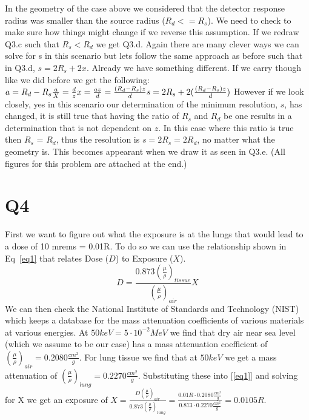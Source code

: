 \documentclass[12pt]{article}
\begin{document}
In the geometry of the case above we considered that the detector response radius was smaller than the source radius ($R_d <= R_s$). We need to check to make sure how things might change if we reverse this assumption. If we redraw Q3.c such that $R_s < R_d$ we get Q3.d. Again there are many clever ways we can solve for s in this scenario but lets follow the same approach as before such that in Q3.d, $s = 2R_s + 2x$. Already we have something different. If we carry though like we did before we get the following:\\
$a = R_d - R_s\\
\frac{a}{X} = \frac{d}{z}\\
x = \frac{az}{d} = \frac{(R_d-R_s)z}{d}\\
s = 2R_s + 2(\frac{(R_d-R_s)z}{d})\\$
However if we look closely, yes in this scenario our determination of the minimum resolution, $s$, has changed, it is still true that having the ratio of $R_s$ and $R_d$ be one results in a determination that is not dependent on $z$. In this case where this ratio is true then $R_s$ = $R_d$, thus the resolution is $s = 2R_s = 2R_d$, no matter what the geometry is. This becomes appearant when we draw it as seen in Q3.e. (All figures for this problem are attached at the end.)


\section{Q4}
First we want to figure out what the exposure is at the lungs that would lead to a dose of 10 mrems = 0.01R. To do so we can use the relationship shown in Eq~\ref{eq1} that relates Dose ($D$) to Exposure ($X$).
\begin{equation}
D = \frac{0.873(\frac{\mu}{\rho})_{tissue}}{(\frac{\mu}{\rho})_{air}}X
\label{eq1}
\end{equation}
\noindent We can then check the National Institute of Standards and Technology (NIST) which keeps a database for the mass attenuation coefficients of various materials at various energies. At $50keV = 5\cdot10^{-2}MeV$ we find that dry air near sea level (which we assume to be our case) has a mass attenuation coefficient of $(\frac{\mu}{\rho})_{air} = 0.2080\frac{cm^2}{g}$. For lung tissue we find that at $50keV$ we get a mass attenuation of $(\frac{\mu}{\rho})_{lung} = 0.2270\frac{cm^2}{g}$. Substituting these into [\ref{eq1}] and solving for X we get an exposure of $X = \frac{D(\frac{\mu}{\rho})_{air}}{0.873(\frac{\mu}{\rho})_{lung} } = \frac{0.01 R \cdot 0.2080\frac{cm^2}{g}}{0.873\cdot 0.2270\frac{cm^2}{g}} = 0.0105 R$. 
\end{document}
